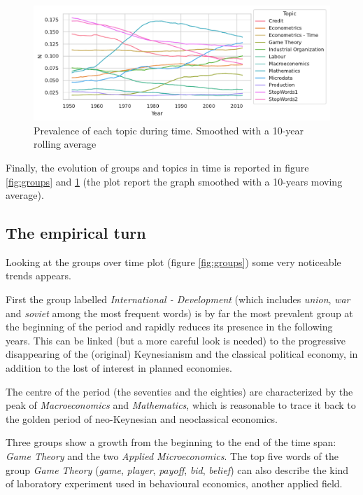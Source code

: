 \documentclass[a4paper, 11pt, headings=standardclasses, tablecaptionsbelow]{scrartcl}
\begin{document}
\begin{figure}[tb]
  \centering
  \includegraphics[width=\textwidth]{src/topics.pdf}
  \caption[Topics]{Prevalence of each topic during time. Smoothed with a 10-year rolling average}
  \label{fig:topics}
\end{figure}

Finally, the evolution of groups and topics in time is reported in figure \ref{fig:groups} and \ref{fig:topics} (the plot report the graph smoothed with a 10-years moving average).

\subsection{The empirical turn}
Looking at the groups over time plot (figure \ref{fig:groups}) some very noticeable trends appears.

First the group labelled \textit{International - Development} (which includes \textit{union}, \textit{war} and \textit{soviet} among the most frequent words) is by far the most prevalent group at the beginning of the period and rapidly reduces its presence in the following years. This can be linked (but a more careful look is needed) to the progressive disappearing of the (original) Keynesianism and the classical political economy, in addition to the lost of interest in planned economies.

The centre of the period (the seventies and the eighties) are characterized by the peak of \textit{Macroeconomics} and \textit{Mathematics}, which is reasonable to trace it back to the golden period of neo-Keynesian and neoclassical economics.

Three groups show a growth from the beginning to the end of the time span: \textit{Game Theory} and the two \textit{Applied Microeconomics}. The top five words of the group \textit{Game Theory} (\textit{game}, \textit{player}, \textit{payoff}, \textit{bid}, \textit{belief}) can also describe the kind of laboratory experiment used in behavioural economics, another applied field.
\end{document}

